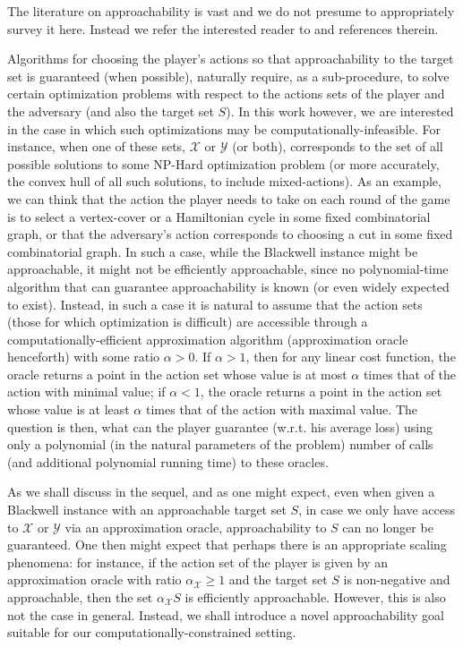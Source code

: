 \documentclass[a4paper,12pt]{article}
\newcommand{\mY}{\mathcal{Y}}
\newcommand{\mX}{\mathcal{X}}
\begin{document}
The literature on approachability is vast and we do not presume to appropriately survey it here. Instead we refer the interested reader to \cite{maschler2020game, perchet2014approachability, cesa2006prediction} and references therein.

Algorithms for choosing the player's actions so that approachability to the target set is guaranteed (when possible), naturally require, as a sub-procedure, to solve certain optimization problems with respect to the actions sets of the player and the adversary (and also the target set $S$). In this work however, we are interested in the case in which such optimizations may be computationally-infeasible. For instance, when one of these sets, $\mX$ or $\mY$ (or both), corresponds to the set of all possible solutions to some NP-Hard optimization problem (or more accurately, the convex hull of all such solutions, to include mixed-actions). As an example, we can think that the action the player needs to take on each round of the game is to select a vertex-cover or a Hamiltonian cycle in some fixed combinatorial graph, or that the adversary's action corresponds to choosing a cut in some fixed combinatorial graph. In such a case, while the Blackwell instance might be approachable, it might not be efficiently approachable, since no polynomial-time algorithm that can guarantee approachability is known (or even widely expected to exist). Instead, in such a case it is natural to assume that the action sets (those for which optimization is difficult) are accessible through a computationally-efficient approximation algorithm (approximation oracle henceforth) with some ratio $\alpha > 0$. If $\alpha > 1$, then for any linear cost function, the oracle returns a point in the action set whose value is at most $\alpha$ times that of the action with minimal value; if $\alpha < 1$,  the oracle returns a point in the action set whose value is at least $\alpha$ times that of the action with maximal value.
The question is then, what can the player guarantee (w.r.t. his average loss) using only a polynomial (in the natural parameters of the problem) number of calls (and additional polynomial running time) to these oracles. 

As we shall discuss in the sequel, and as one might expect, even when given a Blackwell instance with an approachable target set $S$, in case we only have access to $\mX$ or $\mY$ via an approximation oracle, approachability to $S$ can no longer be guaranteed. One then might expect that perhaps there is an appropriate scaling phenomena: for instance, if the action set of the player is given by an approximation oracle with ratio $\alpha_{\mX} \geq 1$ and the target set $S$ is non-negative and approachable, then the set $\alpha_{\mX}S$ is efficiently approachable. However,  this is also not the case in general. Instead, we shall introduce a novel approachability goal suitable for our computationally-constrained setting. 
\end{document}
